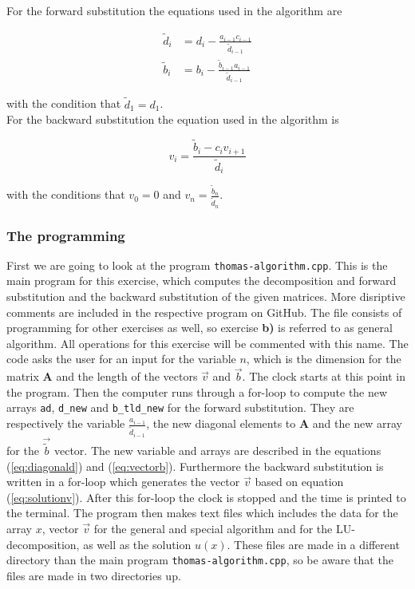 \documentclass{article}
\begin{document}
    For the forward substitution the equations used in the algorithm are

    \begin{align}
      \tilde{d}_i &= d_i - \frac{a_{i-1} c_{i-1}}{\tilde{d} _{i-1}} \label{eq:diagonald} \\
      \tilde{b}_i &= b_i - \frac{\tilde{b}_{i-1} a_{i-1}}{\tilde{d}_{i-1}} \label{eq:vectorb}
    \end{align}

    with the condition that $\tilde{d}_1 = d_1$. \\

    For the backward substitution the equation used in the algorithm is

    \begin{equation}
      v_i = \frac{\tilde{b}_i - c_i v_{i+1}}{\tilde{d}_i} \label{eq:solutionv}
    \end{equation}

    with the conditions that $v_0 = 0$ and $v_n = \frac{\tilde{b}_n}{\tilde{d}_n}$.

  \subsubsection{The programming}

    First we are going to look at the program \texttt{thomas-algorithm.cpp}. This is the main program for this exercise, which computes the decomposition and forward substitution and the backward substitution of the given matrices. More disriptive comments are included in the respective program on GitHub. The file consists of programming for other exercises as well, so exercise \textbf{b)} is referred to as general algorithm. All operations for this exercise will be commented with this name. The code asks the user for an input for the variable $n$, which is the dimension for the matrix \textbf{A} and the length of the vectors $\vec{v}$ and $\vec{b}$. The clock starts at this point in the program. Then the computer runs through a for-loop to compute the new arrays \texttt{ad}, \texttt{d\_new} and \texttt{b\_tld\_new} for the forward substitution. They are respectively the variable $\frac{a_{i-1}}{\tilde{d}_{i-1}}$, the new diagonal elements to \textbf{A} and the new array for the $\vec{\tilde{b}}$
    vector. The new variable and arrays are described in the equations
    (\ref{eq:diagonald}) and (\ref{eq:vectorb}). Furthermore the backward substitution is written in a for-loop which generates the vector $\vec{v}$ based on equation (\ref{eq:solutionv}). After this for-loop the clock is stopped and the time is printed to the terminal. The program then makes text files which includes the data for the array $x$, vector $\vec{v}$ for the general and special algorithm and for the LU-decomposition, as well as the solution $u(x)$. These files are made in a different directory than the main program \texttt{thomas-algorithm.cpp}, so be aware that the files are made in two directories up. \\
\end{document}
